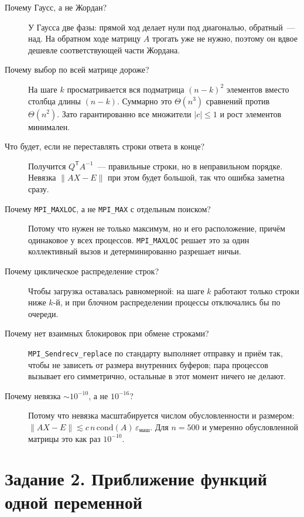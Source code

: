 \documentclass[11pt,a4paper]{report}
\begin{document}
\begin{description}
\item[Почему Гаусс, а не Жордан?] У Гаусса две фазы: прямой ход делает нули под
диагональю, обратный~--- над. На обратном ходе матрицу $A$ трогать уже не
нужно, поэтому он вдвое дешевле соответствующей части Жордана.

\item[Почему выбор по всей матрице дороже?] На шаге $k$ просматривается вся
подматрица $(n-k)^2$ элементов вместо столбца длины $(n-k)$. Суммарно это
$\Theta(n^3)$ сравнений против $\Theta(n^2)$. Зато гарантированно все множители
$|c|\le1$ и рост элементов минимален.

\item[Что будет, если не переставлять строки ответа в конце?] Получится
$Q^{\mathsf T}A^{-1}$~--- правильные строки, но в неправильном порядке. Невязка
$\|AX-E\|$ при этом будет большой, так что ошибка заметна сразу.

\item[Почему \texttt{MPI\_MAXLOC}, а не \texttt{MPI\_MAX} с отдельным поиском?]
Потому что нужен не только максимум, но и его расположение, причём одинаковое
у всех процессов. \texttt{MPI\_MAXLOC} решает это за один коллективный вызов и
детерминированно разрешает ничьи.

\item[Почему циклическое распределение строк?] Чтобы загрузка оставалась
равномерной: на шаге $k$ работают только строки ниже $k$-й, и при блочном
распределении процессы отключались бы по очереди.

\item[Почему нет взаимных блокировок при обмене строками?]
\texttt{MPI\_Sendrecv\_replace} по стандарту выполняет отправку и приём так,
чтобы не зависеть от размера внутренних буферов; пара процессов вызывает его
симметрично, остальные в этот момент ничего не делают.

\item[Почему невязка $\sim10^{-10}$, а не $10^{-16}$?] Потому что невязка
масштабируется числом обусловленности и размером: $\|AX-E\|\lesssim
c\,n\,\mathrm{cond}(A)\,\varepsilon_{\text{маш}}$. Для $n=500$ и умеренно
обусловленной матрицы это как раз $10^{-10}$.
\end{description}

\chapter{Задание 2. Приближение функций одной переменной}
\label{ch:task2}
\end{document}
